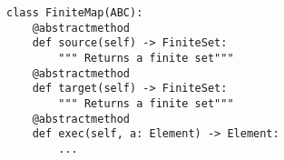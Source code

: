 \par\begin{minipage}{60ex}
\begin{verbatim}
class FiniteMap(ABC):
    @abstractmethod
    def source(self) -> FiniteSet:
        """ Returns a finite set"""
    @abstractmethod
    def target(self) -> FiniteSet:
        """ Returns a finite set"""
    @abstractmethod
    def exec(self, a: Element) -> Element:
        ...
\end{verbatim}
\end{minipage}\par
